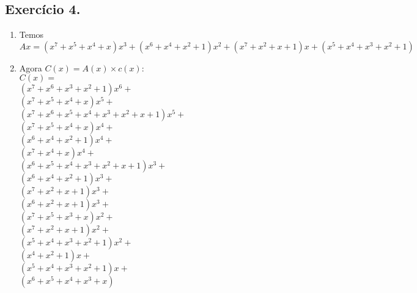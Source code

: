 \documentclass[12pt]{article}
\begin{document}
	\subsection*{Exercício 4.}
		\begin{enumerate}
			\item	
				Temos $$Ax = (x^7 + x^5 + x^4 + x)x^3 + (x^6 + x^4 + x^2 + 1)x^2 + (x^7 + x^2 + x + 1)x + (x^5 + x^4 + x^3 + x^2 + 1)$$
			\item	
				Agora $C(x) = A(x) \times c(x)$:\\
				$C(x) =$\\ 
				$(x^7 + x^6 + x^3 + x^2 + 1)x^6 +$\\
				$(x^7 + x^5 + x^4 + x)x^5 +$\\
				$(x^7 + x^6 + x^5 + x^4 + x^3 + x^2 + x + 1)x^5 +$\\
				$(x^7 + x^5 + x^4 + x)x^4 +$\\
				$(x^6 + x^4 + x^2 + 1)x^4  +$\\
				$(x^7 + x^4 + x)x^4 +$\\
				$(x^6 + x^5 + x^4 + x^3 + x^2 + x + 1)x^3 +$\\
				$(x^6 + x^4 + x^2 + 1)x^3 +$\\
				$(x^7 + x^2 + x + 1)x^3 +$\\
				$(x^6 + x^2 + x + 1)x^3 +$\\
				$(x^7 + x^5 + x^3 + x)x^2 +$\\
				$(x^7 + x^2 + x + 1)x^2 +$\\
				$(x^5 + x^4 + x^3 + x^2 + 1)x^2 +$\\
				$(x^4 + x^2 + 1)x +$\\
				$(x^5 + x^4 + x^3 + x^2 + 1)x +$\\
				$(x^6 + x^5 + x^4 + x^3 + x)$\\
				

\end{enumerate}
\end{document}
